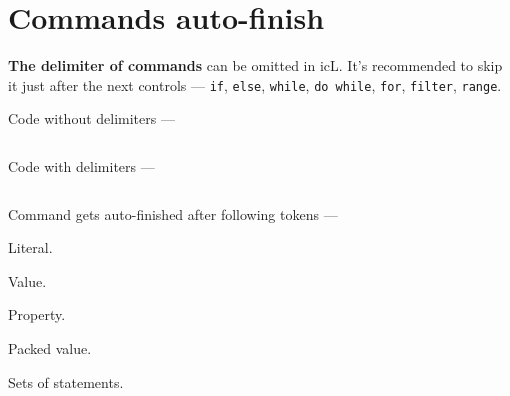 \section{Commands auto-finish}

\textbf{The delimiter of commands} can be omitted in icL. It's recommended to skip it just after the next controls — \texttt{if}, \texttt{else}, \texttt{while}, \texttt{do while}, \texttt{for}, \texttt{filter}, \texttt{range}.

Code without delimiters —
\inputminted[linenos]{icl}{../sources/nodelimiterskipping.icL}

Code with delimiters —
\inputminted[linenos]{icl}{../sources/delimiterskipping.icL}

\newpage
Command gets auto-finished after following tokens —
\begin{icItems}
	\item Literal.
	\item Value.
	\item Property.
	\item Packed value.
	\item Sets of statements.
\end{icItems}
